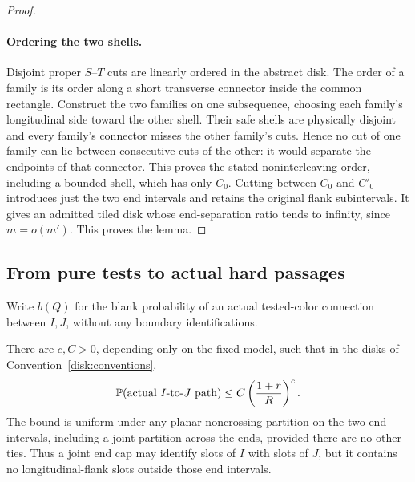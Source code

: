 \begin{proof}
\paragraph{Ordering the two shells.}
Disjoint proper $S$--$T$ cuts are linearly ordered in the abstract disk.
The order of a family is its order along a short transverse connector
inside the common rectangle.  Construct the two families on one
subsequence, choosing each family's longitudinal side toward the
other shell.  Their safe shells are physically disjoint and every
family's connector misses the other family's cuts.  Hence no cut of
one family can lie between consecutive cuts of the other: it would
separate the endpoints of that connector.  This proves the stated
noninterleaving order, including a bounded shell, which has only $C_0$.
Cutting between $C_0$ and $C'_0$ introduces just the two end intervals
and retains the original flank subintervals.  It gives an admitted
tiled disk whose end-separation ratio tends to infinity, since
$m=o(m')$.  This proves the lemma.
\end{proof}

\subsection{From pure tests to actual hard passages}

Write \(b(Q)\) for the blank probability of an actual
tested-color connection between \(I,J\), without any
boundary identifications.

\begin{theorem}
\label{thm:actual-disk}
There are \(c,C>0\), depending only on the fixed model,
such that in the disks of
Convention~\ref{disk:conventions},
\[
 \mathbb P(\text{actual }I\text{-to-}J\text{ path})
 \le C\left(\frac{1+r}{R}\right)^c.
\]
The bound is uniform under any planar noncrossing
partition on the two end intervals, including a
joint partition across the ends, provided there
are no other ties.
Thus a joint end cap may identify slots of \(I\) with slots of \(J\),
but it contains no longitudinal-flank slots outside those end intervals.
\end{theorem}

